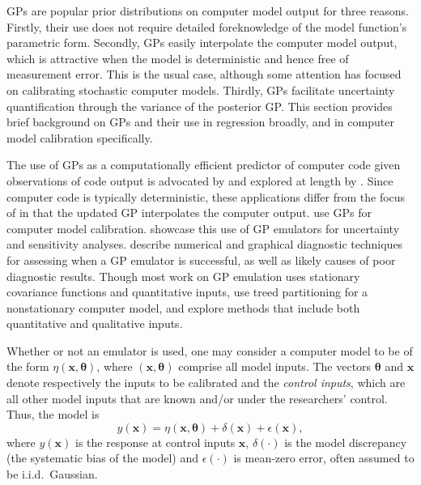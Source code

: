 \documentclass[12pt]{article}
\begin{document}
%
GPs are popular prior distributions on computer model output for three reasons.
%
Firstly, their use does not require detailed foreknowledge of the model function's parametric form.
%
Secondly, GPs easily interpolate the computer model output, which is attractive when the model is deterministic and hence free of measurement error.
%
This is the usual case, although some attention \citep[e.g.,][]{Pratola2018} has focused on calibrating stochastic computer models.
%
Thirdly, GPs facilitate uncertainty quantification through the variance of the posterior GP.
%
This section provides brief background on GPs and their use in regression broadly, and in computer model calibration specifically.
%

%
The use of GPs as a computationally efficient predictor of computer code given observations of code output is advocated by \cite{Sacks1989} and explored at length by \cite{Santner2003a}.
%
Since computer code is typically deterministic, these applications differ from the focus of \cite{OHagan1978} in that the updated GP interpolates the computer output.
%
\cite{Kennedy2001} use GPs for computer model calibration.
%
\cite{Kennedy2006} showcase this use of GP emulators for uncertainty and sensitivity analyses.
%
\cite{Bastos2009} describe numerical and graphical diagnostic techniques for assessing when a GP emulator is successful, as well as likely causes of poor diagnostic results.
%
Though most work on GP emulation uses stationary covariance functions
and quantitative inputs,
%
\cite{Gramacy2008} use treed partitioning for a nonstationary computer model, and
%
\cite{Qian2008} explore methods that include both quantitative and qualitative inputs.
%

%
Whether or not an emulator is used, one may consider a computer model to be of the form $\eta(\mathbf x,\boldsymbol \theta)$, where $(\mathbf x,\boldsymbol \theta)$ comprise all model inputs.
%
The vectors $\boldsymbol \theta$ and $\mathbf x$ denote respectively the inputs to be calibrated and the \emph{control inputs}, which are all other model inputs that are known and/or under the researchers' control.
%
%
%
Thus, the model is
%
\begin{equation} \label{eq:model_gen}
y(\mathbf x)=\eta(\mathbf x,\boldsymbol \theta) + \delta(\mathbf x)+\epsilon(\mathbf x),
\end{equation}
%
where $y(\mathbf x)$ is the response at control inputs $\mathbf x$, $\delta(\cdot)$ is the model discrepancy (the systematic bias of the model) and $\epsilon(\cdot)$ is mean-zero error, often assumed to be i.i.d.\ Gaussian.
%
\end{document}
